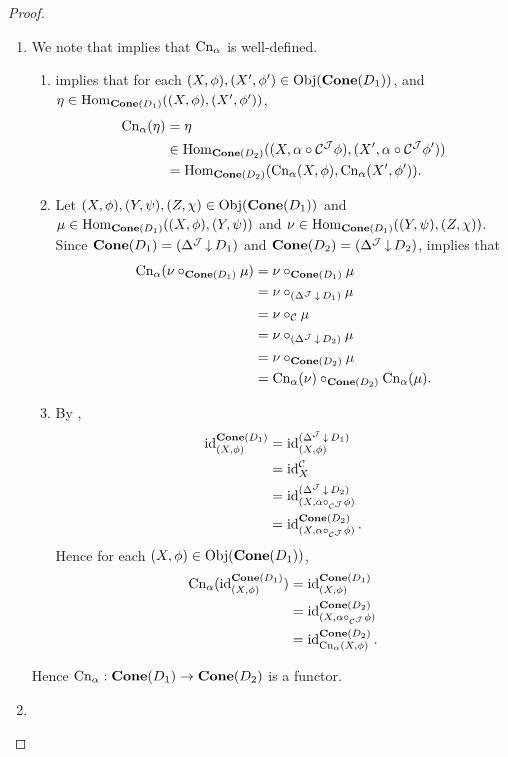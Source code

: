 \documentclass{book}
\begin{document}
	\begin{proof}\
		\begin{enumerate}
			\item We note that  implies that $\Cn_{\al}$ is well-defined. 
			\begin{enumerate}
				\item {} implies that for each $(X, \phi), (X', \phi') \in \Obj(\bCone(D_1))$, and $\eta \in \Hom_{\bCone(D_1)}((X, \phi), (X', \phi'))$,
				\begin{align*}
					\Cn_{\al}(\eta)
					& = \eta \\
					& \in \Hom_{\bCone(D_2)}((X, \al \circ{\MC^{\MJ}} \phi), (X', \al \circ{\MC^{\MJ}} \phi')) \\
					& = \Hom_{\bCone(D_2)}(\Cn_{\al}(X, \phi), \Cn_{\al}(X', \phi')).
				\end{align*}
				\item Let $(X, \phi), (Y, \psi), (Z, \chi) \in \Obj(\bCone(D_1))$ and $\mu \in \Hom_{\bCone(D_1)}((X, \phi), (Y, \psi))$ and $\nu \in \Hom_{\bCone(D_1)}((Y, \psi), (Z, \chi))$. Since $\bCone(D_1) = (\Del^{\MJ} \doar D_1)$ and $\bCone(D_2) = (\Del^{\MJ} \doar D_2)$,   implies that 
				\begin{align*}
					\Cn_{\al}(\nu \circ_{\bCone(D_1)} \mu)
					& = \nu \circ_{\bCone(D_1)} \mu \\
					& = \nu \circ_{(\Del^{\MJ} \doar D_1)} \mu \\
					& = \nu \circ_{\MC} \mu \\
					& = \nu \circ_{(\Del^{\MJ} \doar D_2)} \mu \\
					& = \nu \circ_{\bCone(D_2)} \mu \\
					& = \Cn_{\al}(\nu) \circ_{\bCone(D_2)} \Cn_{\al}(\mu).
				\end{align*} 
				\item 
				By ,  
				\begin{align*}
					\id_{(X, \phi)}^{\bCone(D_1)} 
					& = \id_{(X, \phi)}^{(\Del^{\MJ} \doar D_1)} \\
					& = \id_X^{\MC} \\
					& = \id_{(X, \al \circ_{\MC^{\MJ}} \phi)}^{(\Del^{\MJ} \doar D_2)} \\
					& = \id_{(X, \al \circ_{\MC^{\MJ}} \phi)}^{\bCone(D_2)}.
				\end{align*}
				Hence for each $(X, \phi) \in \Obj(\bCone(D_1))$,
				\begin{align*}
					\Cn_{\al}(\id_{(X, \phi)}^{\bCone(D_1)})
					& = \id_{(X, \phi)}^{\bCone(D_1)} \\
					& = \id_{(X, \al \circ_{\MC^{\MJ}} \phi)}^{\bCone(D_2)} \\
					& = \id_{\Cn_{\al}(X, \phi)}^{\bCone(D_2)}.
				\end{align*}
			\end{enumerate}
			Hence $\Cn_{\al}: \bCone(D_1) \rightarrow \bCone(D_2)$ is a functor.
			\item {}
		\end{enumerate}
	\end{proof}
\end{document}
